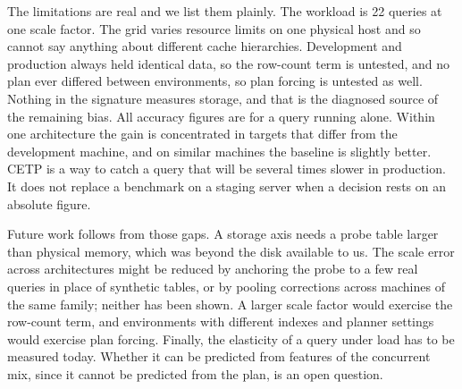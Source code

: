 \documentclass[runningheads]{llncs}
\begin{document}
The limitations are real and we list them plainly. The workload is 22 queries
at one scale factor. The grid varies resource limits on one physical host and
so cannot say anything about different cache hierarchies. Development and
production always held identical data, so the row-count term is untested, and
no plan ever differed between environments, so plan forcing is untested as
well. Nothing in the signature measures storage, and that is the diagnosed
source of the remaining bias. All accuracy figures are for a query running
alone. Within one architecture the gain is concentrated in targets that
differ from the development machine, and on similar machines the baseline is
slightly better. CETP is a way to catch a query that will be several times
slower in production. It does not replace a benchmark on a staging server
when a decision rests on an absolute figure.

Future work follows from those gaps. A storage axis needs a probe table
larger than physical memory, which was beyond the disk available to us. The
scale error across architectures might be reduced by anchoring the probe to a
few real queries in place of synthetic tables, or by pooling corrections
across machines of the same family; neither has been shown. A larger scale
factor would exercise the row-count term, and environments with different
indexes and planner settings would exercise plan forcing. Finally, the
elasticity of a query under load has to be measured today. Whether it can be
predicted from features of the concurrent mix, since it cannot be predicted
from the plan, is an open question.
\end{document}

